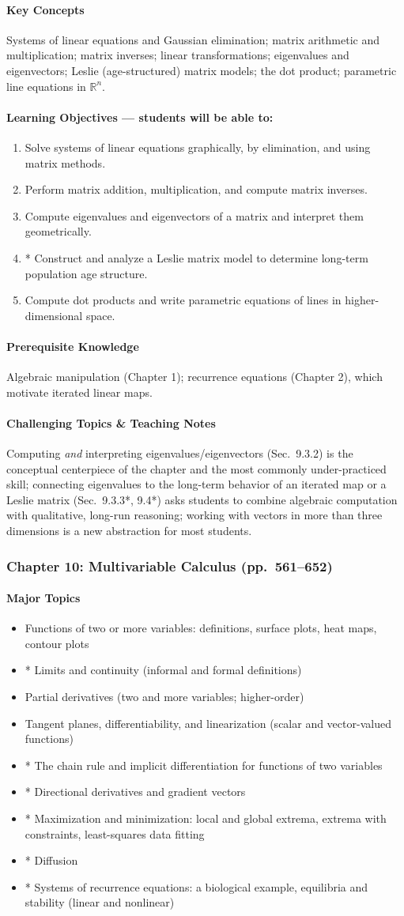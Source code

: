 \documentclass[11pt]{article}
\newcommand{\ChapHead}[2]{\subsubsection{#1 \textnormal{\normalfont\normalsize\color{lightgray}(pp.\ #2)}}}
\newcommand{\MajorTopics}{\paragraph{Major Topics}}
\newcommand{\KeyConcepts}{\paragraph{Key Concepts}}
\newcommand{\LearnObj}{\paragraph{Learning Objectives --- students will be able to:}}
\newcommand{\PreReq}{\paragraph{Prerequisite Knowledge}}
\newcommand{\Hard}{\paragraph{Challenging Topics \& Teaching Notes}}
\begin{document}
\KeyConcepts
Systems of linear equations and Gaussian elimination; matrix arithmetic
and multiplication; matrix inverses; linear transformations; eigenvalues
and eigenvectors; Leslie (age-structured) matrix models; the dot product;
parametric line equations in $\mathbb{R}^n$.

\LearnObj
\begin{enumerate}
\item Solve systems of linear equations graphically, by elimination, and using matrix methods.
\item Perform matrix addition, multiplication, and compute matrix inverses.
\item Compute eigenvalues and eigenvectors of a matrix and interpret them geometrically.
\item * Construct and analyze a Leslie matrix model to determine long-term population age structure.
\item Compute dot products and write parametric equations of lines in higher-dimensional space.
\end{enumerate}

\PreReq Algebraic manipulation (Chapter 1); recurrence equations (Chapter 2), which motivate iterated linear maps.

\Hard Computing \emph{and} interpreting eigenvalues/eigenvectors (Sec.\
9.3.2) is the conceptual centerpiece of the chapter and the most commonly
under-practiced skill; connecting eigenvalues to the long-term behavior of
an iterated map or a Leslie matrix (Sec.\ 9.3.3*, 9.4*) asks students to
combine algebraic computation with qualitative, long-run reasoning; working
with vectors in more than three dimensions is a new abstraction for most
students.

\bigskip
\ChapHead{Chapter 10: Multivariable Calculus}{561--652}

\MajorTopics
\begin{itemize}
\item Functions of two or more variables: definitions, surface plots, heat maps, contour plots
\item * Limits and continuity (informal and formal definitions)
\item Partial derivatives (two and more variables; higher-order)
\item Tangent planes, differentiability, and linearization (scalar and vector-valued functions)
\item * The chain rule and implicit differentiation for functions of two variables
\item * Directional derivatives and gradient vectors
\item * Maximization and minimization: local and global extrema, extrema with constraints, least-squares data fitting
\item * Diffusion
\item * Systems of recurrence equations: a biological example, equilibria and stability (linear and nonlinear)
\end{itemize}
\end{document}
